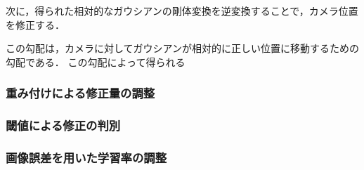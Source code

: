 次に，得られた相対的なガウシアンの剛体変換を逆変換することで，カメラ位置を修正する．



この勾配は，カメラに対してガウシアンが相対的に正しい位置に移動するための勾配である．
この勾配によって得られる


\subsubsection{重み付けによる修正量の調整}
\subsubsection*{閾値による修正の判別}
\subsubsection*{画像誤差を用いた学習率の調整}